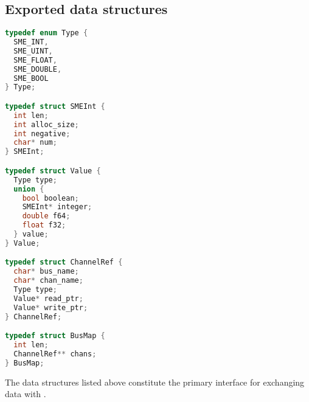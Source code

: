 \subsection{Exported data structures}
\begin{lstlisting}[language=c,multicols=2]
typedef enum Type {
  SME_INT,
  SME_UINT,
  SME_FLOAT,
  SME_DOUBLE,
  SME_BOOL
} Type;

typedef struct SMEInt {
  int len;
  int alloc_size;
  int negative;
  char* num;
} SMEInt;

typedef struct Value {
  Type type;
  union {
    bool boolean;
    SMEInt* integer;
    double f64;
    float f32;
  } value;
} Value;

typedef struct ChannelRef {
  char* bus_name;
  char* chan_name;
  Type type;
  Value* read_ptr;
  Value* write_ptr;
} ChannelRef;

typedef struct BusMap {
  int len;
  ChannelRef** chans;
} BusMap;
\end{lstlisting}

The data structures listed above constitute the primary interface for exchanging
data with \libsme{}.


